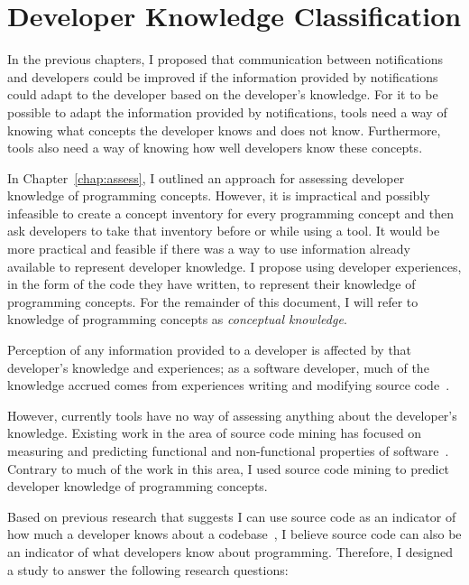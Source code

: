 \chapter{Developer Knowledge Classification}
\label{chap:experience}

In the previous chapters, I proposed that communication between notifications and developers could be improved if the information provided by notifications could adapt to the developer based on the developer's knowledge. 	
For it to be possible to adapt the information provided by notifications, tools need a way of knowing what concepts the developer knows and does not know. Furthermore, tools also need a way of knowing how well developers know these concepts. 	

In Chapter~\ref{chap:assess}, I outlined an approach for assessing developer knowledge of programming concepts. However, it is impractical and possibly infeasible to create a concept inventory for every programming concept and then ask developers to take that inventory before or while using a tool. It would be more practical and feasible if there was a way to use information already available to represent developer knowledge. I propose using developer experiences, in the form of the code they have written, to represent their knowledge of programming concepts. For the remainder of this document, I will refer to knowledge of programming concepts as \textit{conceptual knowledge}.  

Perception of any information provided to a developer is affected by that developer's knowledge and experiences; as a software developer, much of the knowledge accrued comes from experiences writing and modifying source code~\cite{Canas:1994:Mental,raju1995differential,fritz2010degree,argote2011organizational}.

However, currently tools have no way of assessing anything about the developer's knowledge.
Existing work in the area of source code mining has focused on measuring and predicting functional and non-functional properties of software~\cite{heckman2009model,menzies2007data,haapio2011exploring}. 
Contrary to much of the work in this area, I used source code mining to predict developer knowledge of programming concepts.

Based on previous research that suggests I can use source code as an indicator of how much a developer knows about a codebase~\cite{fritz2010degree}, I believe source code can also be an indicator of what developers know about programming.
Therefore, I designed a study to answer the following research questions:

